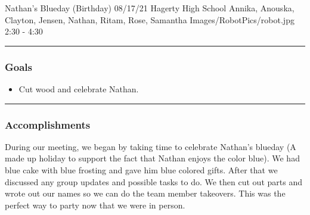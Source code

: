 \insertmeeting 
	{Nathan's Blueday (Birthday)} 
	{08/17/21}
	{Hagerty High School}
	{Annika, Anouska, Clayton, Jensen, Nathan, Ritam, Rose, Samantha}
	{Images/RobotPics/robot.jpg}
	{2:30 - 4:30}
	
\noindent\hfil\rule{\textwidth}{.4pt}\hfil
\subsubsection*{Goals}
\begin{itemize}
    \item Cut wood and celebrate Nathan.

\end{itemize} 

\noindent\hfil\rule{\textwidth}{.4pt}\hfil

\subsubsection*{Accomplishments}
During our meeting, we began by taking time to celebrate Nathan's blueday (A made up holiday to support the fact that Nathan enjoys the color blue). We had blue cake with blue frosting and gave him blue colored gifts. After that we discussed any group updates and possible tasks to do. We then cut out parts and wrote out our names so we can do the team member takeovers. This was the perfect way to party now that we were in person.

